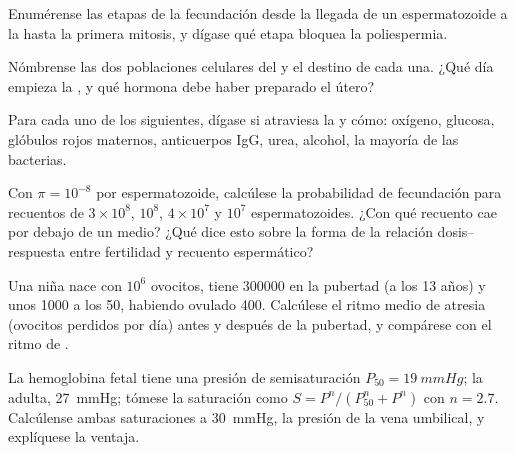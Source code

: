 \begin{exercise}[$\star$]\label{exo:b2:mammal-reproduction:2}
Enumérense las etapas de la fecundación desde la llegada de un
espermatozoide a la  hasta la primera mitosis, y dígase qué
etapa bloquea la poliespermia.
\end{exercise}

\begin{exercise}[$\star$]\label{exo:b2:mammal-reproduction:3}
Nómbrense las dos poblaciones celulares del  y el destino de
cada una. ¿Qué día empieza la , y qué hormona debe haber
preparado el útero?
\end{exercise}

\begin{exercise}[$\star$]\label{exo:b2:mammal-reproduction:4}
Para cada uno de los siguientes, dígase si atraviesa la  y cómo:
oxígeno, glucosa, glóbulos rojos maternos, anticuerpos IgG, urea,
alcohol, la mayoría de las bacterias.
\end{exercise}

\begin{exercise}[$\star\star$]\label{exo:b2:mammal-reproduction:5}
Con $\pi = 10^{-8}$ por espermatozoide, calcúlese la probabilidad de
fecundación para recuentos de $3\times 10^{8}$, $10^{8}$,
$4\times 10^{7}$ y $10^{7}$ espermatozoides. ¿Con qué recuento cae por
debajo de un medio? ¿Qué dice esto sobre la forma de la relación
dosis--respuesta entre fertilidad y recuento espermático?
\end{exercise}

\begin{exercise}[$\star\star$]\label{exo:b2:mammal-reproduction:6}
Una niña nace con $10^{6}$ ovocitos, tiene \num{300000} en la pubertad
(a los 13 años) y unos \num{1000} a los 50, habiendo ovulado \num{400}.
Calcúlese el ritmo medio de atresia (ovocitos perdidos por día) antes y
después de la pubertad, y compárese con el ritmo de .
\end{exercise}

\begin{exercise}[$\star\star$]\label{exo:b2:mammal-reproduction:7}
La hemoglobina fetal tiene una presión de semisaturación $P_{50} =
\qty{19}{mmHg}$; la adulta, \qty{27}{mmHg}; tómese la saturación como
$S = P^{n}/(P_{50}^{n} + P^{n})$ con $n = 2.7$. Calcúlense ambas
saturaciones a \qty{30}{mmHg}, la presión de la vena umbilical, y
explíquese la ventaja.
\end{exercise}

